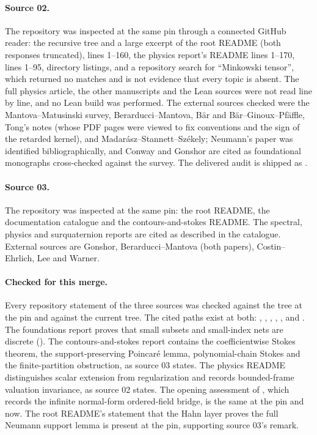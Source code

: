 \documentclass[11pt,letterpaper]{article}
\theoremstyle{definition}
\theoremstyle{remark}
\begin{document}
\paragraph{Source 02.} The repository was inspected at the same pin through a
connected GitHub reader: the recursive tree and a large excerpt of the root
README (both responses truncated),  lines 1--160, the
physics report's README lines 1--170,  lines
1--95, directory listings, and a repository search for ``Minkowski tensor'',
which returned no matches and is not evidence that every topic is absent. The
full physics article, the other manuscripts and the Lean sources were not read
line by line, and no Lean build was performed. The external sources checked were
the Mantova--Matusinski survey, Berarducci--Mantova, B\"ar and
B\"ar--Ginoux--Pf\"affle, Tong's notes (whose PDF pages were viewed to fix
conventions and the sign of the retarded kernel), and Madar\'asz--Stannett--Sz\'ekely;
Neumann's paper was identified bibliographically, and Conway and Gonshor are cited
as foundational monographs cross-checked against the survey. The delivered audit
is shipped as .

\paragraph{Source 03.} The repository was inspected at the same pin: the root
README, the documentation catalogue and the contours-and-stokes README. The
spectral, physics and surquaternion reports are cited as described in the
catalogue. External sources are Gonshor, Berarducci--Mantova (both papers),
Costin--Ehrlich, Lee and Warner.

\paragraph{Checked for this merge.} Every repository statement of the three
sources was checked against the tree at the pin and against the current tree.
The cited paths exist at both:
,
,
,
,
,
 and .
The foundations report proves that small subsets and small-index nets are
discrete (). The contours-and-stokes report contains
the coefficientwise Stokes theorem, the support-preserving Poincar\'e lemma,
polynomial-chain Stokes and the finite-partition obstruction, as source 03
states. The physics README distinguishes scalar extension from regularization
and records bounded-frame valuation invariance, as source 02 states. The
opening assessment of , which records the
infinite normal-form ordered-field bridge, is the same at the pin and now. The
root README's statement that the Hahn layer proves the full Neumann support
lemma is present at the pin, supporting source 03's remark.
\end{document}
